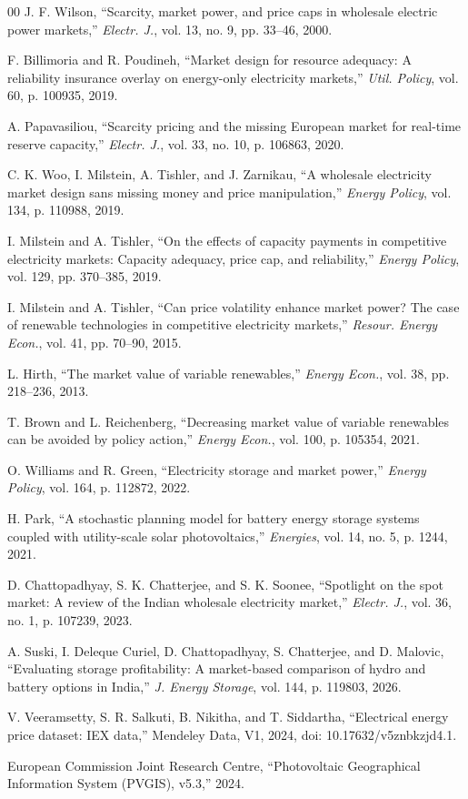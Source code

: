\documentclass[conference,a4paper]{IEEEtran}
\begin{document}
\begin{thebibliography}{00}
 J. F. Wilson, ``Scarcity, market power, and price caps in wholesale electric power markets,'' \textit{Electr. J.}, vol. 13, no. 9, pp. 33--46, 2000.

 F. Billimoria and R. Poudineh, ``Market design for resource adequacy: A reliability insurance overlay on energy-only electricity markets,'' \textit{Util. Policy}, vol. 60, p. 100935, 2019.

 A. Papavasiliou, ``Scarcity pricing and the missing European market for real-time reserve capacity,'' \textit{Electr. J.}, vol. 33, no. 10, p. 106863, 2020.

 C. K. Woo, I. Milstein, A. Tishler, and J. Zarnikau, ``A wholesale electricity market design sans missing money and price manipulation,'' \textit{Energy Policy}, vol. 134, p. 110988, 2019.

 I. Milstein and A. Tishler, ``On the effects of capacity payments in competitive electricity markets: Capacity adequacy, price cap, and reliability,'' \textit{Energy Policy}, vol. 129, pp. 370--385, 2019.

 I. Milstein and A. Tishler, ``Can price volatility enhance market power? The case of renewable technologies in competitive electricity markets,'' \textit{Resour. Energy Econ.}, vol. 41, pp. 70--90, 2015.

 L. Hirth, ``The market value of variable renewables,'' \textit{Energy Econ.}, vol. 38, pp. 218--236, 2013.

 T. Brown and L. Reichenberg, ``Decreasing market value of variable renewables can be avoided by policy action,'' \textit{Energy Econ.}, vol. 100, p. 105354, 2021.

 O. Williams and R. Green, ``Electricity storage and market power,'' \textit{Energy Policy}, vol. 164, p. 112872, 2022.

 H. Park, ``A stochastic planning model for battery energy storage systems coupled with utility-scale solar photovoltaics,'' \textit{Energies}, vol. 14, no. 5, p. 1244, 2021.

 D. Chattopadhyay, S. K. Chatterjee, and S. K. Soonee, ``Spotlight on the spot market: A review of the Indian wholesale electricity market,'' \textit{Electr. J.}, vol. 36, no. 1, p. 107239, 2023.

 A. Suski, I. Deleque Curiel, D. Chattopadhyay, S. Chatterjee, and D. Malovic, ``Evaluating storage profitability: A market-based comparison of hydro and battery options in India,'' \textit{J. Energy Storage}, vol. 144, p. 119803, 2026.

 V. Veeramsetty, S. R. Salkuti, B. Nikitha, and T. Siddartha, ``Electrical energy price dataset: IEX data,'' Mendeley Data, V1, 2024, doi: 10.17632/v5znbkzjd4.1.

 European Commission Joint Research Centre, ``Photovoltaic Geographical Information System (PVGIS), v5.3,'' 2024.

\end{thebibliography}
\end{document}

